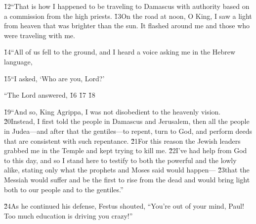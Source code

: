 \v{12}``That is how I happened to be traveling to Damascus with authority based on a commission from the high priests. \v{13}On the road at noon, O King, I saw a light from heaven that was brighter than the sun. It flashed around me and those who were traveling with me.

\v{14}``All of us fell to the ground, and I heard a voice asking me in the Hebrew language, 

\v{15}``I asked, `Who are you, Lord?'

``The Lord answered,  \v{16} \v{17} \v{18}

\v{19}``And so, King Agrippa, I was not disobedient to the heavenly vision. \v{20}Instead, I first told the people in Damascus and Jerusalem, then all the people in Judea---and after that the gentiles---to repent, turn to God, and perform deeds that are consistent with such repentance. \v{21}For this reason the Jewish leaders grabbed me in the Temple and kept trying to kill me. \v{22}I've had help from God to this day, and so I stand here to testify to both the powerful and the lowly alike, stating only what the prophets and Moses said would happen--- \v{23}that the Messiah would suffer and be the first to rise from the dead and would bring light both to our people and to the gentiles.''

\v{24}As he continued his defense, Festus shouted, ``You're out of your mind, Paul! Too much education is driving you crazy!''

